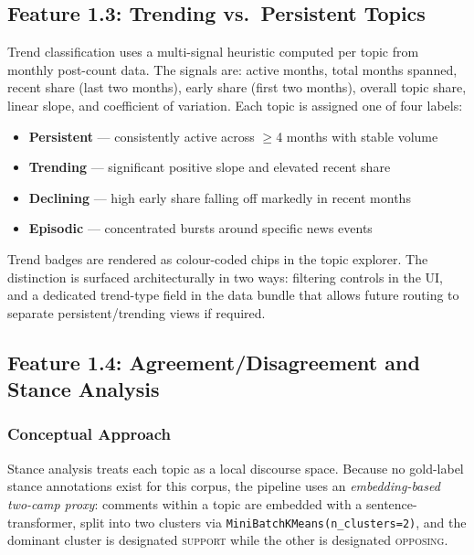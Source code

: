 \documentclass[11pt,a4paper]{article}
\begin{document}
\subsection{Feature 1.3: Trending vs.\ Persistent Topics}

Trend classification uses a multi-signal heuristic computed per topic from monthly post-count data. The signals are: active months, total months spanned, recent share (last two months), early share (first two months), overall topic share, linear slope, and coefficient of variation. Each topic is assigned one of four labels:

\begin{itemize}
  \item \textbf{\color{softgreen}Persistent} --- consistently active across $\geq$4 months with stable volume
  \item \textbf{\color{accentred}Trending} --- significant positive slope and elevated recent share
  \item \textbf{\color{gold}Declining} --- high early share falling off markedly in recent months
  \item \textbf{\color{highlightblue}Episodic} --- concentrated bursts around specific news events
\end{itemize}

Trend badges are rendered as colour-coded chips in the topic explorer. The distinction is surfaced architecturally in two ways: filtering controls in the UI, and a dedicated trend-type field in the data bundle that allows future routing to separate persistent/trending views if required.

\subsection{Feature 1.4: Agreement/Disagreement and Stance Analysis}

\subsubsection{Conceptual Approach}

Stance analysis treats each topic as a local discourse space. Because no gold-label stance annotations exist for this corpus, the pipeline uses an \textit{embedding-based two-camp proxy}: comments within a topic are embedded with a sentence-transformer, split into two clusters via \texttt{MiniBatchKMeans(n\_clusters=2)}, and the dominant cluster is designated \textsc{support} while the other is designated \textsc{opposing}.
\end{document}
